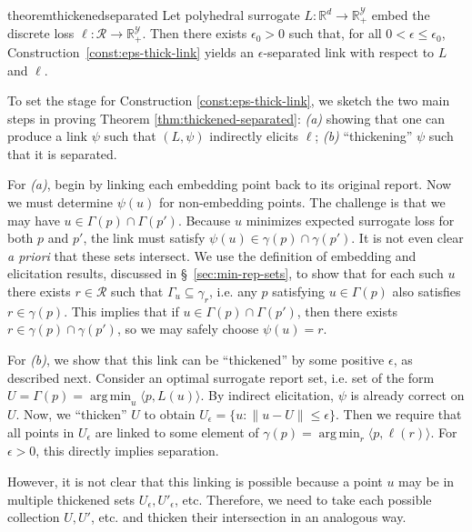 \documentclass[11pt]{article}
\newcommand{\reals}{\mathbb{R}}
\newcommand{\R}{\mathcal{R}}
\newcommand{\Y}{\mathcal{Y}}
\newcommand{\inprod}[2]{\langle #1, #2 \rangle}%
\DeclareMathOperator*{\argmin}{arg\,min}
\begin{document}
\begin{restatable}{theorem}{thickenedseparated} \label{thm:thickened-separated}
  Let polyhedral surrogate $L:\reals^d \to \reals^\Y_+$ embed the discrete loss $\ell:\R\to\reals^\Y_+$.
  Then there exists $\epsilon_0 > 0$ such that, for all $0 < \epsilon \leq \epsilon_0$, Construction~\ref{const:eps-thick-link} yields an $\epsilon$-separated link with respect to $L$ and $\ell$.
\end{restatable}

To set the stage for Construction \ref{const:eps-thick-link}, we sketch the two main steps in proving Theorem \ref{thm:thickened-separated}: \emph{(a)} showing that one can produce a link $\psi$ such that $(L,\psi)$ indirectly elicits $\ell$; \emph{(b)} ``thickening'' $\psi$ such that it is separated.

For \emph{(a)}, begin by linking each embedding point back to its original report.
Now we must determine $\psi(u)$ for non-embedding points.
The challenge is that we may have $u \in \Gamma(p) \cap \Gamma(p')$.
Because $u$ minimizes expected surrogate loss for both $p$ and $p'$, the link must satisfy $\psi(u) \in \gamma(p) \cap \gamma(p')$.
It is not even clear \emph{a priori} that these sets intersect.
We use the definition of embedding and elicitation results, discussed in \S~\ref{sec:min-rep-sets}, to show that for each such $u$ there exists $r \in \R$ such that $\Gamma_u \subseteq \gamma_r$, i.e. any $p$ satisfying $u \in \Gamma(p)$ also satisfies $r \in \gamma(p)$.
This implies that if $u \in \Gamma(p) \cap \Gamma(p')$, then there exists $r \in \gamma(p) \cap \gamma(p')$, so we may safely choose $\psi(u) = r$.

For \emph{(b)}, we show that this link can be ``thickened'' by some positive $\epsilon$, as described next.
Consider an optimal surrogate report set, i.e. set of the form $U = \Gamma(p) = \argmin_u \inprod{p}{L(u)}$.
By indirect elicitation, $\psi$ is already correct on $U$.
Now, we ``thicken'' $U$ to obtain $U_{\epsilon} = \{u : \|u - U\| \leq \epsilon\}$.
Then we require that all points in $U_{\epsilon}$ are linked to some element of $\gamma(p) = \argmin_r \inprod{p}{\ell(r)}$.
For $\epsilon > 0$, this directly implies separation.

However, it is not clear that this linking is possible because a point $u$ may be in multiple thickened sets $U_{\epsilon}, U'_{\epsilon}$, etc.
Therefore, we need to take each possible collection $U,U'$, etc. and thicken their intersection in an analogous way.
\end{document}

